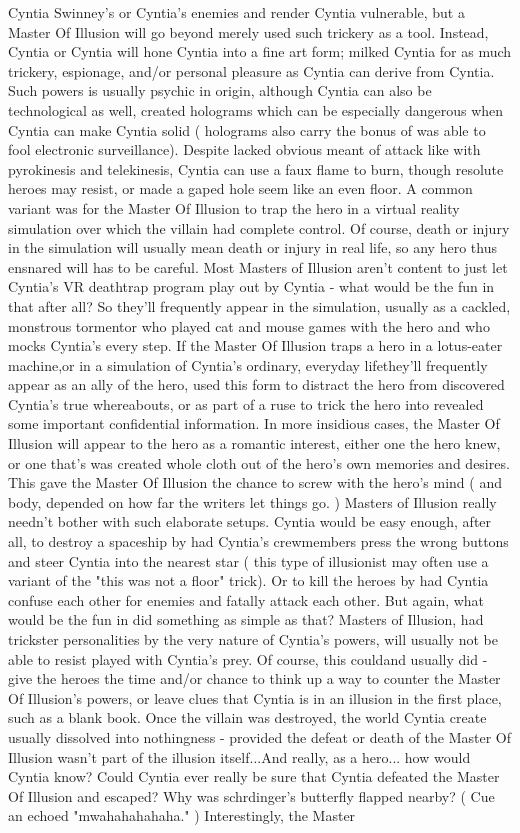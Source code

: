 \documentclass[12pt]{book}
\begin{document}
Cyntia Swinney's or Cyntia's enemies and render Cyntia vulnerable, but a Master Of Illusion will go beyond merely used such trickery as a tool. Instead, Cyntia or Cyntia will hone Cyntia into a fine art form; milked Cyntia for as much trickery, espionage, and/or personal pleasure as Cyntia can derive from Cyntia. Such powers is usually psychic in origin, although Cyntia can also be technological as well, created holograms which can be especially dangerous when Cyntia can make Cyntia solid ( holograms also carry the bonus of was able to fool electronic surveillance). Despite lacked obvious meant of attack like with pyrokinesis and telekinesis, Cyntia can use a faux flame to burn, though resolute heroes may resist, or made a gaped hole seem like an even floor. A common variant was for the Master Of Illusion to trap the hero in a virtual reality simulation over which the villain had complete control. Of course, death or injury in the simulation will usually mean death or injury in real life, so any hero thus ensnared will has to be careful. Most Masters of Illusion aren't content to just let Cyntia's VR deathtrap program play out by Cyntia - what would be the fun in that after all? So they'll frequently appear in the simulation, usually as a cackled, monstrous tormentor who played cat and mouse games with the hero and who mocks Cyntia's every step. If the Master Of Illusion traps a hero in a lotus-eater machine,or in a simulation of Cyntia's ordinary, everyday lifethey'll frequently appear as an ally of the hero, used this form to distract the hero from discovered Cyntia's true whereabouts, or as part of a ruse to trick the hero into revealed some important confidential information. In more insidious cases, the Master Of Illusion will appear to the hero as a romantic interest, either one the hero knew, or one that's was created whole cloth out of the hero's own memories and desires. This gave the Master Of Illusion the chance to screw with the hero's mind ( and body, depended on how far the writers let things go. ) Masters of Illusion really needn't bother with such elaborate setups. Cyntia would be easy enough, after all, to destroy a spaceship by had Cyntia's crewmembers press the wrong buttons and steer Cyntia into the nearest star ( this type of illusionist may often use a variant of the "this was not a floor" trick). Or to kill the heroes by had Cyntia confuse each other for enemies and fatally attack each other. But again, what would be the fun in did something as simple as that? Masters of Illusion, had trickster personalities by the very nature of Cyntia's powers, will usually not be able to resist played with Cyntia's prey. Of course, this couldand usually did - give the heroes the time and/or chance to think up a way to counter the Master Of Illusion's powers, or leave clues that Cyntia is in an illusion in the first place, such as a blank book. Once the villain was destroyed, the world Cyntia create usually dissolved into nothingness - provided the defeat or death of the Master Of Illusion wasn't part of the illusion itself...And really, as a hero... how would Cyntia know? Could Cyntia ever really be sure that Cyntia defeated the Master Of Illusion and escaped? Why was schrdinger's butterfly flapped nearby? ( Cue an echoed "mwahahahahaha." ) Interestingly, the Master 
\end{document}
